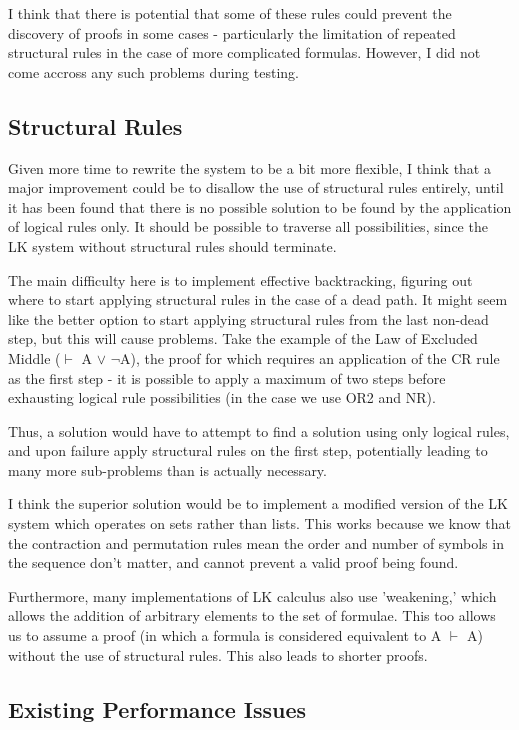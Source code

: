 \documentclass{article}
\begin{document}
I think that there is potential that some of these rules could prevent the
discovery of proofs in some cases - particularly the limitation of repeated
structural rules in the case of more complicated formulas. However, I did not
come accross any such problems during testing.

\subsection{Structural Rules}

Given more time to rewrite the system to be a bit more flexible, I think that a
major improvement could be to disallow the use of structural rules entirely,
until it has been found that there is no possible solution to be found by the
application of logical rules only. It should be possible to traverse all
possibilities, since the LK system without structural rules should terminate.

The main difficulty here is to implement
effective backtracking, figuring out where to start applying structural rules
in the case of a dead path. It might seem like the better option to start
applying structural rules from the last non-dead step, but this will cause
problems. Take the example of the Law of Excluded Middle
($\vdash$ A $\vee$ $\neg$A), the proof for which requires an application of the
CR rule as the first step - it is possible to apply a maximum of two steps
before exhausting logical rule possibilities (in the case we use OR2 and NR).

Thus, a solution would have to attempt to find a solution using only logical
rules, and upon failure apply structural rules on the first step, potentially
leading to many more sub-problems than is actually necessary.

I think the superior solution would be to implement a modified version of the LK
system which operates on sets rather than lists. This works because we know
that the contraction and permutation rules mean the order and number of symbols
in the sequence don't matter, and cannot prevent a valid proof being found.

Furthermore, many implementations of LK calculus also use 'weakening,' which
allows the addition of arbitrary elements to the set of formulae. This too
allows us to assume a proof (in which a formula is considered equivalent to A
$\vdash$ A) without the use of structural rules. This also leads to shorter
proofs.

\subsection{Existing Performance Issues}
\end{document}
